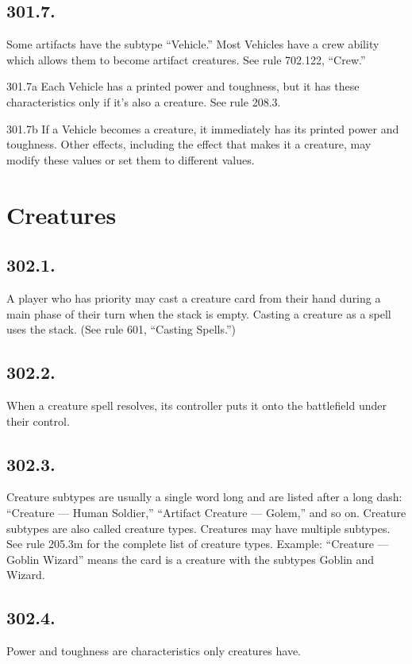 \subsection*{301.7.}
Some artifacts have the subtype “Vehicle.” Most Vehicles have a crew ability which allows them to become artifact creatures. See rule 702.122, “Crew.”

301.7a Each Vehicle has a printed power and toughness, but it has these characteristics only if it’s also a creature. See rule 208.3.

301.7b If a Vehicle becomes a creature, it immediately has its printed power and toughness. Other effects, including the effect that makes it a creature, may modify these values or set them to different values.

\section{Creatures}
\subsection*{302.1.}
A player who has priority may cast a creature card from their hand during a main phase of their turn when the stack is empty. Casting a creature as a spell uses the stack. (See rule 601, “Casting Spells.”)

\subsection*{302.2.}
When a creature spell resolves, its controller puts it onto the battlefield under their control.

\subsection*{302.3.}
Creature subtypes are usually a single word long and are listed after a long dash: “Creature — Human Soldier,” “Artifact Creature — Golem,” and so on. Creature subtypes are also called creature types. Creatures may have multiple subtypes. See rule 205.3m for the complete list of creature types.
Example: “Creature — Goblin Wizard” means the card is a creature with the subtypes Goblin and Wizard.

\subsection*{302.4.}
Power and toughness are characteristics only creatures have.

